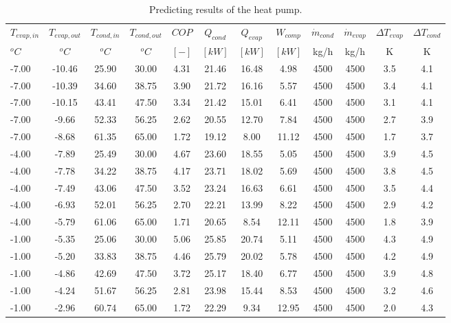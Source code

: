 \documentclass[english]{SPFShortReport}
\begin{document}
\begin{table}[!ht]
\begin{small}
\caption{Predicting results of the heat pump.}
\begin{center}
\resizebox{12cm}{!} 
{
\begin{tabular}{l | c c c c c c c c c c c } 
\hline
\hline
$T_{evap,in}$ &$T_{evap,out}$ &$T_{cond,in}$ &$T_{cond,out}$ &$COP$ &$Q_{cond}$ &$Q_{evap}$ &$W_{comp}$ &$\dot m_{cond}$ &$\dot m_{evap}$ &$\Delta T_{evap}$ &$\Delta T_{cond}$ \\ 
$^oC$ &$^oC$ &$^oC$ &$^oC$ &$[-]$ &$[kW]$ &$[kW]$ &$[kW]$ &kg/h &kg/h &K &K\\ 
\hline
-7.00 & -10.46 & 25.90 & 30.00 & 4.31 & 21.46 & 16.48 & 4.98 & 4500 & 4500 & 3.5 & 4.1\\ 
-7.00 & -10.39 & 34.60 & 38.75 & 3.90 & 21.72 & 16.16 & 5.57 & 4500 & 4500 & 3.4 & 4.1\\ 
-7.00 & -10.15 & 43.41 & 47.50 & 3.34 & 21.42 & 15.01 & 6.41 & 4500 & 4500 & 3.1 & 4.1\\ 
-7.00 & -9.66 & 52.33 & 56.25 & 2.62 & 20.55 & 12.70 & 7.84 & 4500 & 4500 & 2.7 & 3.9\\ 
-7.00 & -8.68 & 61.35 & 65.00 & 1.72 & 19.12 & 8.00 & 11.12 & 4500 & 4500 & 1.7 & 3.7\\ 
-4.00 & -7.89 & 25.49 & 30.00 & 4.67 & 23.60 & 18.55 & 5.05 & 4500 & 4500 & 3.9 & 4.5\\ 
-4.00 & -7.78 & 34.22 & 38.75 & 4.17 & 23.71 & 18.02 & 5.69 & 4500 & 4500 & 3.8 & 4.5\\ 
-4.00 & -7.49 & 43.06 & 47.50 & 3.52 & 23.24 & 16.63 & 6.61 & 4500 & 4500 & 3.5 & 4.4\\ 
-4.00 & -6.93 & 52.01 & 56.25 & 2.70 & 22.21 & 13.99 & 8.22 & 4500 & 4500 & 2.9 & 4.2\\ 
-4.00 & -5.79 & 61.06 & 65.00 & 1.71 & 20.65 & 8.54 & 12.11 & 4500 & 4500 & 1.8 & 3.9\\ 
-1.00 & -5.35 & 25.06 & 30.00 & 5.06 & 25.85 & 20.74 & 5.11 & 4500 & 4500 & 4.3 & 4.9\\ 
-1.00 & -5.20 & 33.83 & 38.75 & 4.46 & 25.79 & 20.02 & 5.78 & 4500 & 4500 & 4.2 & 4.9\\ 
-1.00 & -4.86 & 42.69 & 47.50 & 3.72 & 25.17 & 18.40 & 6.77 & 4500 & 4500 & 3.9 & 4.8\\ 
-1.00 & -4.24 & 51.67 & 56.25 & 2.81 & 23.98 & 15.44 & 8.53 & 4500 & 4500 & 3.2 & 4.6\\ 
-1.00 & -2.96 & 60.74 & 65.00 & 1.72 & 22.29 & 9.34 & 12.95 & 4500 & 4500 & 2.0 & 4.3\\ 

\end{tabular}}
\end{center}
\end{small}
\end{table}
\end{document}

